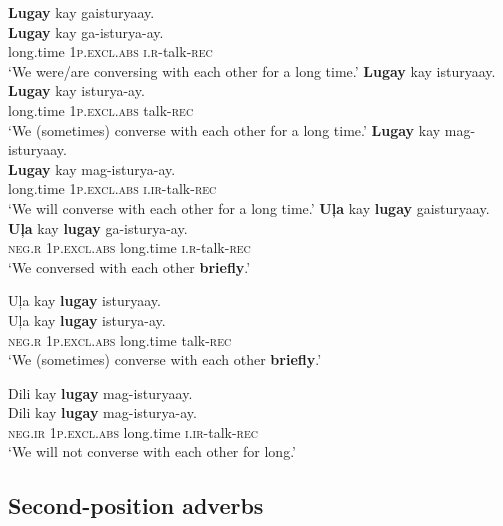 \ea
\textbf{Lugay}  kay  gaisturyaay. \\\smallskip
 \gll \textbf{Lugay}  kay  ga-isturya-ay. \\
long.time  1\textsc{p.excl.abs}  \textsc{i.r}-talk-\textsc{rec} \\
\glt ‘We were/are conversing with each other for a long time.’
\z
\ea
\textbf{Lugay}  kay  isturyaay. \\\smallskip
 \gll \textbf{Lugay}  kay  isturya-ay. \\
long.time  1\textsc{p.excl.abs}  talk-\textsc{rec} \\
\glt ‘We (sometimes) converse with each other for a long time.’
\z
\ea
\textbf{Lugay}  kay  mag-isturyaay. \\\smallskip
 \gll \textbf{Lugay}  kay  mag-isturya-ay. \\
long.time  1\textsc{p.excl.abs}  \textsc{i.ir}-talk-\textsc{rec} \\
\glt ‘We will converse with each other for a long time.’
\z
\ea
\textbf{Uļa}  kay  \textbf{lugay}  gaisturyaay. \\\smallskip
 \gll \textbf{Uļa}  kay  \textbf{lugay}  ga-isturya-ay. \\
\textsc{neg.r}  1\textsc{p.excl.abs}  long.time  \textsc{i.r}-talk-\textsc{rec} \\
\glt ‘We conversed with each other \textbf{briefly}.’
\z


\ea
Uļa  kay  \textbf{lugay}  isturyaay. \\\smallskip
 \gll Uļa  kay  \textbf{lugay}  isturya-ay. \\
\textsc{neg.r}  1\textsc{p.excl.abs}  long.time  talk-\textsc{rec} \\
\glt ‘We (sometimes) converse with each other \textbf{briefly}.’
\z

\ea
Dili  kay  \textbf{lugay}  mag-isturyaay. \\\smallskip
 \gll Dili  kay  \textbf{lugay}  mag-isturya-ay. \\
\textsc{neg.ir}  1\textsc{p.excl.abs}  long.time  \textsc{i.ir}-talk-\textsc{rec} \\
\glt ‘We will not converse with each other for long.’
\z

\subsection{Second-position adverbs}
\label{bkm:Ref441599628} \label{bkm:Ref479858962} \label{sec:secondpositionadverbs}

